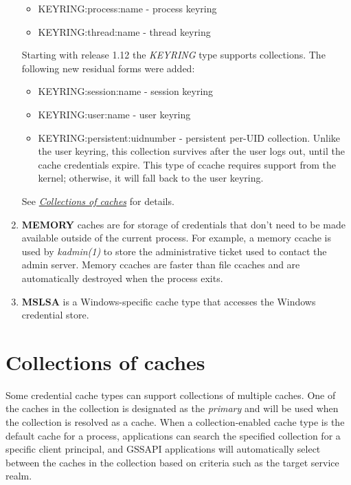 \documentclass[letterpaper,10pt,english]{sphinxmanual}
\begin{document}
\begin{enumerate}
\begin{itemize}
\item {} 
KEYRING:process:name - process keyring

\item {} 
KEYRING:thread:name -  thread keyring

\end{itemize}

Starting with release 1.12 the \emph{KEYRING} type supports collections.
The following new residual forms were added:
\begin{itemize}
\item {} 
KEYRING:session:name - session keyring

\item {} 
KEYRING:user:name - user keyring

\item {} 
KEYRING:persistent:uidnumber - persistent per-UID collection.
Unlike the user keyring, this collection survives after the user
logs out, until the cache credentials expire.  This type of
ccache requires support from the kernel; otherwise, it will fall
back to the user keyring.

\end{itemize}

See {\hyperref[basic/ccache_def:col-ccache]{\emph{Collections of caches}}} for details.

\item {} 
\textbf{MEMORY} caches are for storage of credentials that don't need to
be made available outside of the current process.  For example, a
memory ccache is used by \emph{kadmin(1)} to store the
administrative ticket used to contact the admin server.  Memory
ccaches are faster than file ccaches and are automatically
destroyed when the process exits.

\item {} 
\textbf{MSLSA} is a Windows-specific cache type that accesses the
Windows credential store.

\end{enumerate}


\section{Collections of caches}
\label{basic/ccache_def:collections-of-caches}\label{basic/ccache_def:col-ccache}
Some credential cache types can support collections of multiple
caches.  One of the caches in the collection is designated as the
\emph{primary} and will be used when the collection is resolved as a cache.
When a collection-enabled cache type is the default cache for a
process, applications can search the specified collection for a
specific client principal, and GSSAPI applications will automatically
select between the caches in the collection based on criteria such as
the target service realm.
\end{document}
